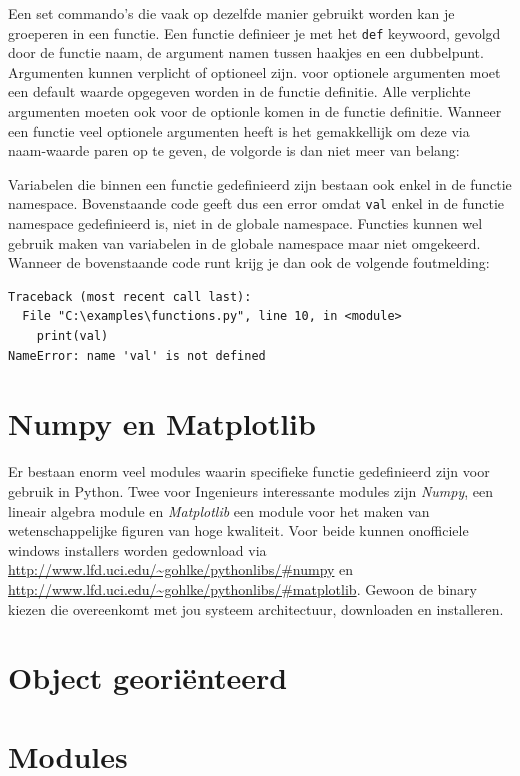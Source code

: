 \documentclass[11pt,twoside]{article}
\begin{document}
Een set commando's die vaak op dezelfde manier gebruikt worden kan je groeperen in een functie. Een functie definieer je met het \lstinline{def} keywoord, gevolgd door de functie naam, de argument namen tussen haakjes en een dubbelpunt. Argumenten kunnen verplicht of optioneel zijn. voor optionele argumenten moet een default waarde opgegeven worden in de functie definitie. Alle verplichte argumenten moeten ook voor de optionle komen in de functie definitie. Wanneer een functie veel optionele argumenten heeft is het gemakkellijk om deze via naam-waarde paren op te geven, de volgorde is dan niet meer van belang:

Variabelen die binnen een functie gedefinieerd zijn bestaan ook enkel in de functie namespace. Bovenstaande code geeft dus een error omdat \lstinline{val} enkel in de functie namespace gedefinieerd is, niet in de globale namespace. Functies kunnen wel gebruik maken van variabelen in de globale namespace maar niet omgekeerd. Wanneer de bovenstaande code runt krijg je dan ook de volgende foutmelding:
\begin{lstlisting}
Traceback (most recent call last):
  File "C:\examples\functions.py", line 10, in <module>
    print(val)
NameError: name 'val' is not defined
\end{lstlisting}

	\section{Numpy en Matplotlib} 
Er bestaan enorm veel modules waarin specifieke functie gedefinieerd zijn voor gebruik in Python. Twee voor Ingenieurs interessante modules zijn \emph{Numpy}, een lineair algebra module en \emph{Matplotlib} een module voor het maken van wetenschappelijke figuren van hoge kwaliteit. Voor beide kunnen onofficiele windows installers worden gedownload via \url{http://www.lfd.uci.edu/~gohlke/pythonlibs/#numpy} en \url{http://www.lfd.uci.edu/~gohlke/pythonlibs/#matplotlib}. Gewoon de binary kiezen die overeenkomt met jou systeem architectuur, downloaden en installeren.


	\section{Object georiënteerd} 
	
 	\section{Modules}
\end{document}
